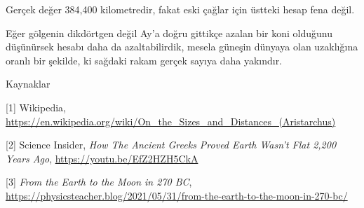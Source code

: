 \documentclass[12pt,fleqn]{article}\usepackage{../../common}
\begin{document}
Gerçek değer 384,400 kilometredir, fakat eski çağlar için üstteki hesap fena
değil.

Eğer gölgenin dikdörtgen değil Ay'a doğru gittikçe azalan bir koni olduğunu
düşünürsek hesabı daha da azaltabilirdik, mesela güneşin dünyaya olan uzaklığına
oranlı bir şekilde, ki sağdaki rakam gerçek sayıya daha yakındır.

Kaynaklar

[1] Wikipedia,
    \url{https://en.wikipedia.org/wiki/On_the_Sizes_and_Distances_(Aristarchus)}

[2] Science Insider, {\em How The Ancient Greeks Proved Earth Wasn't Flat 2,200 Years Ago},
    \url{https://youtu.be/EfZ2HZH5CkA}

[3] {\em From the Earth to the Moon in 270 BC},
    \url{https://physicsteacher.blog/2021/05/31/from-the-earth-to-the-moon-in-270-bc/}
    
\end{document}
